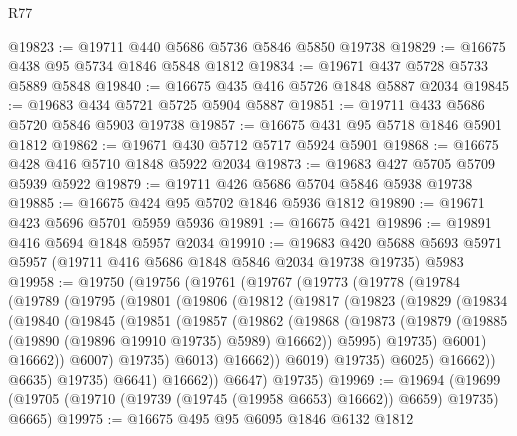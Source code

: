 \begin{lexlean}{R77}
\begin{coremodule}
@19823 := @19711 @440 @5686 @5736 @5846 @5850 @19738
@19829 := @16675 @438 @95 @5734 @1846 @5848 @1812
@19834 := @19671 @437 @5728 @5733 @5889 @5848
@19840 := @16675 @435 @416 @5726 @1848 @5887 @2034
@19845 := @19683 @434 @5721 @5725 @5904 @5887
@19851 := @19711 @433 @5686 @5720 @5846 @5903 @19738
@19857 := @16675 @431 @95 @5718 @1846 @5901 @1812
@19862 := @19671 @430 @5712 @5717 @5924 @5901
@19868 := @16675 @428 @416 @5710 @1848 @5922 @2034
@19873 := @19683 @427 @5705 @5709 @5939 @5922
@19879 := @19711 @426 @5686 @5704 @5846 @5938 @19738
@19885 := @16675 @424 @95 @5702 @1846 @5936 @1812
@19890 := @19671 @423 @5696 @5701 @5959 @5936
@19891 := @16675 @421
@19896 := @19891 @416 @5694 @1848 @5957 @2034
@19910 := @19683
    @420
    @5688
    @5693
    @5971
    @5957
    (@19711 @416 @5686 @1848 @5846 @2034 @19738 @19735)
    @5983
@19958 := @19750
    (@19756
      (@19761
        (@19767
          (@19773
            (@19778
              (@19784
                (@19789
                  (@19795
                    (@19801
                      (@19806
                        (@19812
                          (@19817
                            (@19823
                              (@19829
                                (@19834
                                  (@19840
                                    (@19845
                                      (@19851
                                        (@19857
                                          (@19862
                                            (@19868
                                              (@19873
                                                (@19879
                                                  (@19885
                                                    (@19890 (@19896 @19910 @19735) @5989)
                                                    @16662))
                                                @5995)
                                              @19735)
                                            @6001)
                                          @16662))
                                      @6007)
                                    @19735)
                                  @6013)
                                @16662))
                            @6019)
                          @19735)
                        @6025)
                      @16662))
                  @6635)
                @19735)
              @6641)
            @16662))
        @6647)
      @19735)
@19969 := @19694
    (@19699 (@19705 (@19710 (@19739 (@19745 (@19958 @6653) @16662)) @6659) @19735) @6665)
@19975 := @16675 @495 @95 @6095 @1846 @6132 @1812

\end{coremodule}
\end{lexlean}
